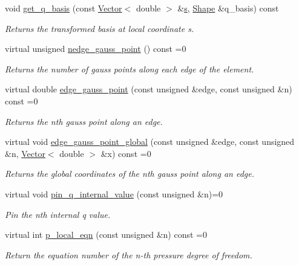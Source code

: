 \begin{DoxyCompactItemize}
void \hyperlink{classoomph_1_1PoroelasticityEquations_ab027d56e9fc87ca73290002c10c173df}{get\+\_\+q\+\_\+basis} (const \hyperlink{classoomph_1_1Vector}{Vector}$<$ double $>$ \&\hyperlink{cfortran_8h_ab7123126e4885ef647dd9c6e3807a21c}{s}, \hyperlink{classoomph_1_1Shape}{Shape} \&q\+\_\+basis) const
\begin{DoxyCompactList}\small\item\em Returns the transformed basis at local coordinate s. \end{DoxyCompactList}\item 
virtual unsigned \hyperlink{classoomph_1_1PoroelasticityEquations_aa01b0fb38667776634b5f33bf8859886}{nedge\+\_\+gauss\+\_\+point} () const =0
\begin{DoxyCompactList}\small\item\em Returns the number of gauss points along each edge of the element. \end{DoxyCompactList}\item 
virtual double \hyperlink{classoomph_1_1PoroelasticityEquations_af1e01a7f1546cc7e4c19bc3a6de145da}{edge\+\_\+gauss\+\_\+point} (const unsigned \&edge, const unsigned \&n) const =0
\begin{DoxyCompactList}\small\item\em Returns the nth gauss point along an edge. \end{DoxyCompactList}\item 
virtual void \hyperlink{classoomph_1_1PoroelasticityEquations_a9809ca678dced8e69cb74dd7a75dffda}{edge\+\_\+gauss\+\_\+point\+\_\+global} (const unsigned \&edge, const unsigned \&n, \hyperlink{classoomph_1_1Vector}{Vector}$<$ double $>$ \&x) const =0
\begin{DoxyCompactList}\small\item\em Returns the global coordinates of the nth gauss point along an edge. \end{DoxyCompactList}\item 
virtual void \hyperlink{classoomph_1_1PoroelasticityEquations_a25b900a66e8e31ec0e5f432fcdf115d5}{pin\+\_\+q\+\_\+internal\+\_\+value} (const unsigned \&n)=0
\begin{DoxyCompactList}\small\item\em Pin the nth internal q value. \end{DoxyCompactList}\item 
virtual int \hyperlink{classoomph_1_1PoroelasticityEquations_a98642c2cf0e476f4068c12d1fc8b61b9}{p\+\_\+local\+\_\+eqn} (const unsigned \&n) const =0
\begin{DoxyCompactList}\small\item\em Return the equation number of the n-\/th pressure degree of freedom. \end{DoxyCompactList}\item 

\end{DoxyCompactItemize}
